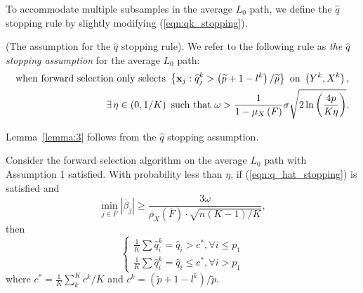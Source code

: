 \documentclass[11pt,review,authoryear]{elsarticle}
\begin{document}
\begin{appendices}
To accommodate multiple subsamples in the average $L_0$ path, we define the $\widehat{q}$ stopping rule by slightly modifying (\ref{eqn:qk_stopping}).
%
\begin{definition}
  (The assumption for the $\widehat{q}$ stopping rule). We refer to the following rule as \emph{the $\widehat{q}$ stopping assumption} for the average $L_0$ path:
  \begin{eqnarray}
    \mbox{when forward selection only selects } \left\{ \mathbf{x}_j:\widehat{q}_j^k > \left( \widetilde{p} + 1 - l^k \right) / \widetilde{p} \right\} \mbox{ on } \left(Y^k, X^k \right), \notag \\
    \exists\, \eta \in \left( 0, 1/K\right) \mbox{ such that } \omega >\frac{1}{1-\mu_{X}\left(F\right)}\sigma\sqrt{2\ln\left( \frac{4p}{K\eta}\right)}.
    \label{eqn:q_hat_stopping}
  \end{eqnarray}
\end{definition}
\medskip

Lemma~\ref{lemma:3} follows from the $\widehat{q}$ stopping assumption.

\begin{lemma}
  Consider the forward selection algorithm on the average $L_{0}$ path with Assumption 1 satisfied. With probability less than $\eta$, if (\ref{eqn:q_hat_stopping}) is satisfied and
  \[
      \min_{j\in\overline{F}}\left|\overline{\beta}_{j}\right|\geqslant\frac{3\omega}{\rho_{X}\left(\overline{F}\right)\cdot\sqrt{n\left(K-1\right)/K}},
  \]
  then
  \[
  \begin{cases}
      \frac{1}{K}\sum\widehat{q}_{i}^{k}=\widehat{q}_{i}> c^* ,\forall i\leqslant p_{1}\\
      \frac{1}{K}\sum\widehat{q}_{i}^{k}=\widehat{q}_{i}\leqslant c^*,\forall i>p_{1}
  \end{cases}
  \]
  where $c^* = \frac{1}{K} \sum_k^K c^k / K$ and $c^k = \left(\widetilde{p} + 1 - l^k\right) / \widetilde{p}$.
  \label{lemma:3}
\end{lemma}


\end{appendices}
\end{document}

